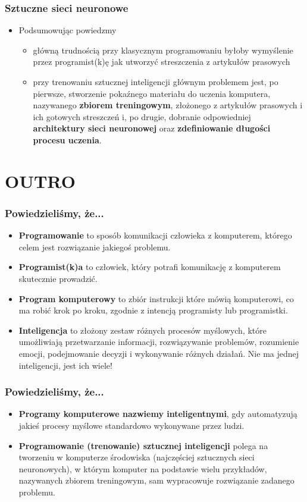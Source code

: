 \documentclass{beamer}
\begin{document}
\begin{frame}[fragile]
\frametitle{Sztuczne sieci neuronowe}
\begin{itemize}
\item Podsumowując powiedzmy
	\begin{itemize}
	\item główną trudnością przy klasycznym programowaniu byłoby wymyślenie przez programist(k)ę jak utworzyć streszczenia z artykułów prasowych
	\item przy trenowaniu sztucznej inteligencji głównym problemem jest, po pierwsze, stworzenie pokaźnego materiału do uczenia komputera, nazywanego \textbf{zbiorem treningowym}, złożonego z artykułów prasowych i ich gotowych streszczeń i, po drugie, dobranie odpowiedniej \textbf{architektury sieci neuronowej} oraz \textbf{zdefiniowanie długości procesu uczenia}.
	\end{itemize}
\end{itemize}

\end{frame}

\section{OUTRO}

\begin{frame}[fragile]
\frametitle{Powiedzieliśmy, że...}
 \begin{itemize}
\item \textbf{Programowanie} to sposób komunikacji człowieka z komputerem, którego celem jest rozwiązanie jakiegoś problemu.
\item \textbf{Programist(k)a} to człowiek, który potrafi komunikację z komputerem skutecznie prowadzić. 
\item \textbf{Program komputerowy} to zbiór instrukcji które mówią komputerowi, co ma robić krok po kroku, zgodnie z intencją programisty lub programistki. 
\item \textbf{Inteligencja} to złożony zestaw różnych procesów myślowych, które umożliwiają przetwarzanie informacji, rozwiązywanie problemów, rozumienie emocji, podejmowanie decyzji i wykonywanie różnych działań. Nie ma jednej inteligencji, jest ich wiele! 
\end{itemize}
\end{frame}

\begin{frame}[fragile]
\frametitle{Powiedzieliśmy, że...}
\begin{itemize}
\item \textbf{Programy komputerowe nazwiemy inteligentnymi}, gdy automatyzują jakieś procesy myślowe standardowo wykonywane przez ludzi.
\item \textbf{Programowanie (trenowanie) sztucznej inteligencji} polega na tworzeniu w komputerze środowiska (najczęściej sztucznych sieci neuronowych), w  którym komputer na podstawie wielu przykładów, nazywanych zbiorem treningowym, sam wypracowuje rozwiązanie zadanego problemu. 
\end{itemize}
\end{frame}
\end{document}
